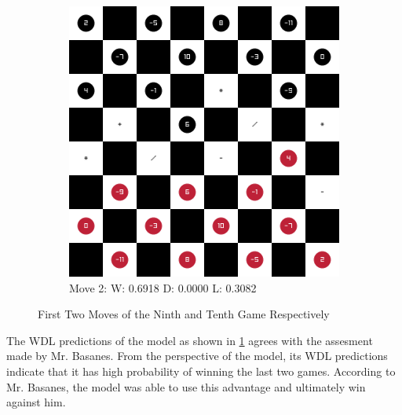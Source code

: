\begin{figure}[H]
\begin{subfigure}{0.4\textwidth}
        \includegraphics[width=\textwidth]{images/games/game10/move_2.png}
        \caption*{Move 2: W: 0.6918 D: 0.0000 L: 0.3082}
    \end{subfigure}
    \caption{First Two Moves of the Ninth and Tenth Game Respectively}
    \label{fig:unconventional-moves}
\end{figure}

The WDL predictions of the model as shown in \ref{fig:unconventional-moves} agrees with the assesment made by Mr. Basanes. From the perspective of the model, its WDL predictions indicate that it has high probability of winning the last two games. According to Mr. Basanes, the model was able to use this advantage and ultimately win against him.